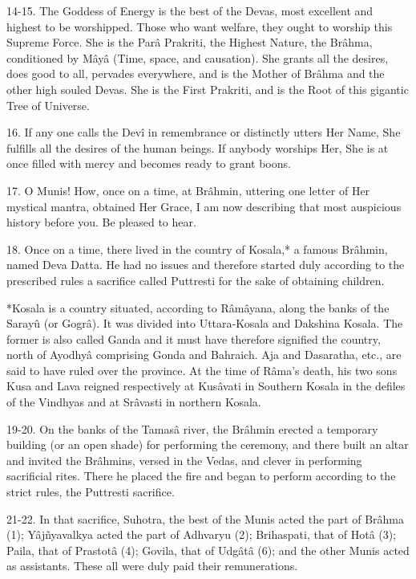 14-15. The Goddess of Energy is the best of the Devas, most excellent and highest to be worshipped. Those who want welfare, they ought to worship this Supreme Force. She is the Par\^a Prakriti, the Highest Nature, the Br\^ahma, conditioned by M\^ay\^a (Time, space, and causation). She grants all the desires, does good to all, pervades everywhere, and is the Mother of Br\^ahma and the other high souled Devas. She is the First Prakriti, and is the Root of this gigantic Tree of Universe.

16. If any one calls the Dev\^i in remembrance or distinctly utters Her Name, She fulfills all the desires of the human beings. If anybody worships Her, She is at once filled with mercy and becomes ready to grant boons.

17. O Munis! How, once on a time, at Br\^ahmin, uttering one letter of Her mystical mantra, obtained Her Grace, I am now describing that most auspicious history before you. Be pleased to hear.

18. Once on a time, there lived in the country of Kosala,* a famous Br\^ahmin, named Deva Datta. He had no issues and therefore started duly according to the prescribed rules a sacrifice called Puttresti for the sake of obtaining children.

*Kosala is a country situated, according to R\^am\^ayana, along the banks of the Sarayû (or Gogr\^a). It was divided into Uttara-Kosala and Dakshina Kosala. The former is also called Ganda and it must have therefore signified the country, north of Ayodhy\^a comprising Gonda and Bahraich. Aja and Dasaratha, etc., are said to have ruled over the province. At the time of R\^ama's death, his two sons Kusa and Lava reigned respectively at Kus\^avati in Southern Kosala in the defiles of the Vindhyas and at Sr\^avasti in northern Kosala.

19-20. On the banks of the Tamas\^a river, the Br\^ahmin erected a temporary building (or an open shade) for performing the ceremony, and there built an altar and invited the Br\^ahmins, versed in the Vedas, and clever in performing sacrificial rites. There he placed the fire and began to perform according to the strict rules, the Puttresti sacrifice.

21-22. In that sacrifice, Suhotra, the best of the Munis acted the part of Br\^ahma (1); Y\^aj\~nyavalkya acted the part of Adhvaryu (2); Brihaspati, that of Hot\^a (3); Paila, that of Prastot\^a (4); Govila, that of Udg\^at\^a (6); and the other Munis acted as assistants. These all were duly paid their remunerations.

